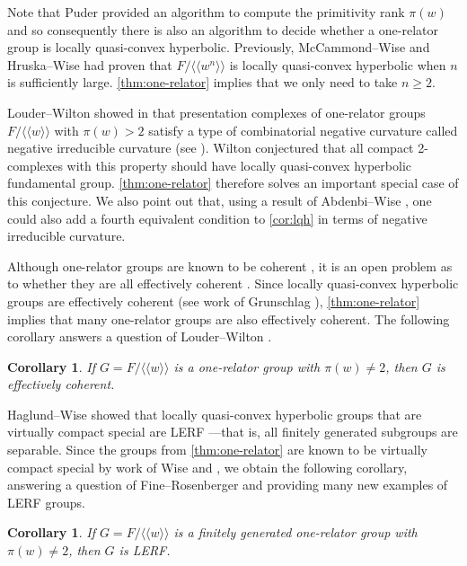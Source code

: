 \documentclass[11pt, a4paper]{amsart}
\newtheorem{corollary}[theorem]{Corollary}
\theoremstyle{definition}
\newcommand{\normal}[1]{\langle\!\langle #1 \rangle\!\rangle}
\begin{document}
Note that Puder provided an algorithm to compute the primitivity rank $\pi(w)$ \cite{Pu14} and so consequently there is also an algorithm to decide whether a one-relator group is locally quasi-convex hyperbolic. Previously, McCammond--Wise \cite{MW05} and Hruska--Wise \cite{HW01} had proven that $F/\normal{w^n}$ is locally quasi-convex hyperbolic when $n$ is sufficiently large. \cref{thm:one-relator} implies that we only need to take $n\geqslant 2$.

Louder--Wilton showed in \cite{LW24} that presentation complexes of one-relator groups $F/\normal{w}$ with $\pi(w)> 2$ satisfy a type of combinatorial negative curvature called negative irreducible curvature (see \cite[Theorem 10.7]{Wi24}). Wilton conjectured \cite[Conjecture 12.9]{Wi24} that all compact 2-complexes with this property should have locally quasi-convex hyperbolic fundamental group. \cref{thm:one-relator} therefore solves an important special case of this conjecture. We also point out that, using a result of Abdenbi--Wise \cite{AW23}, one could also add a fourth equivalent condition to \cref{cor:lqh} in terms of negative irreducible curvature.

Although one-relator groups are known to be coherent \cite{JZL25}, it is an open problem as to whether they are all effectively coherent \cite[Problem 2.5.33]{CFL25}. Since locally quasi-convex hyperbolic groups are effectively coherent (see work of Grunschlag \cite[Proposition 6.1]{Gr99}), \cref{thm:one-relator} implies that many one-relator groups are also effectively coherent. The following corollary answers a question of Louder--Wilton \cite[Question 6.7]{LW24}.

\begin{corollary}
If $G = F/\normal{w}$ is a one-relator group with $\pi(w)\neq 2$, then $G$ is effectively coherent.
\end{corollary}

Haglund--Wise \cite{HW08} showed that locally quasi-convex hyperbolic groups that are virtually compact special are LERF ---that is, all finitely generated subgroups are separable. Since the groups from \cref{thm:one-relator} are known to be virtually compact special by work of Wise \cite{Wi21} and \cite{Li25}, we obtain the following corollary, answering a question of Fine--Rosenberger \cite[Question OR9]{FR01} and providing many new examples of LERF groups.

\begin{corollary}
If $G = F/\normal{w}$ is a finitely generated one-relator group with $\pi(w)\neq 2$, then $G$ is LERF.
\end{corollary}
\end{document}
